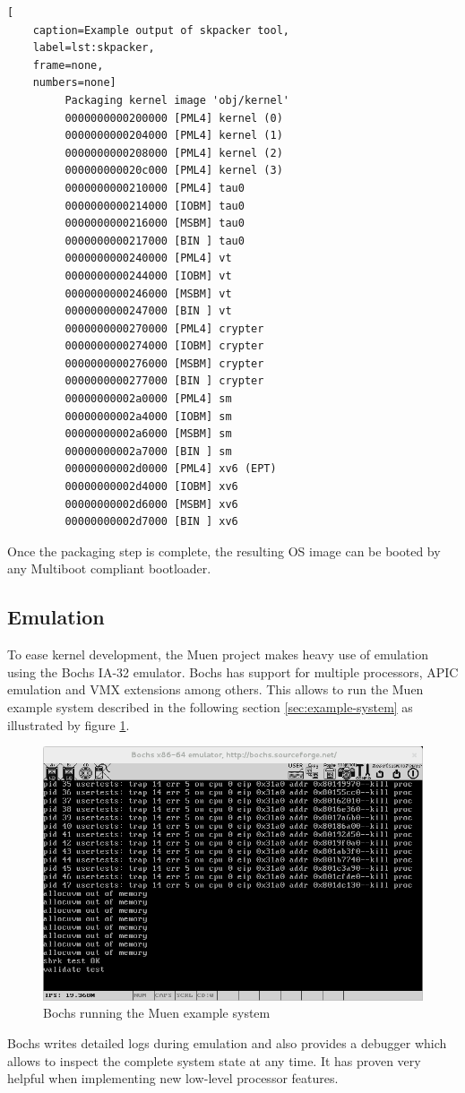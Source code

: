 \begin{lstlisting}[
	caption=Example output of skpacker tool,
	label=lst:skpacker,
	frame=none,
	numbers=none]
         Packaging kernel image 'obj/kernel'
         0000000000200000 [PML4] kernel (0)
         0000000000204000 [PML4] kernel (1)
         0000000000208000 [PML4] kernel (2)
         000000000020c000 [PML4] kernel (3)
         0000000000210000 [PML4] tau0
         0000000000214000 [IOBM] tau0
         0000000000216000 [MSBM] tau0
         0000000000217000 [BIN ] tau0
         0000000000240000 [PML4] vt
         0000000000244000 [IOBM] vt
         0000000000246000 [MSBM] vt
         0000000000247000 [BIN ] vt
         0000000000270000 [PML4] crypter
         0000000000274000 [IOBM] crypter
         0000000000276000 [MSBM] crypter
         0000000000277000 [BIN ] crypter
         00000000002a0000 [PML4] sm
         00000000002a4000 [IOBM] sm
         00000000002a6000 [MSBM] sm
         00000000002a7000 [BIN ] sm
         00000000002d0000 [PML4] xv6 (EPT)
         00000000002d4000 [IOBM] xv6
         00000000002d6000 [MSBM] xv6
         00000000002d7000 [BIN ] xv6
\end{lstlisting}

Once the packaging step is complete, the resulting OS image can be booted by any
Multiboot \cite{multiboot} compliant bootloader.

\subsection{Emulation}
To ease kernel development, the Muen project makes heavy use of emulation using
the Bochs IA-32 emulator. Bochs has support for multiple processors, APIC
emulation and VMX extensions among others. This allows to run the Muen example
system described in the following section \ref{sec:example-system} as
illustrated by figure \ref{fig:bochs}.

\begin{figure}[h]
	\centering
	\includegraphics[width=\textwidth]{images/bochs}
	\caption{Bochs running the Muen example system}
	\label{fig:bochs}
\end{figure}

Bochs writes detailed logs during emulation and also provides a debugger which
allows to inspect the complete system state at any time. It has proven very
helpful when implementing new low-level processor features.
